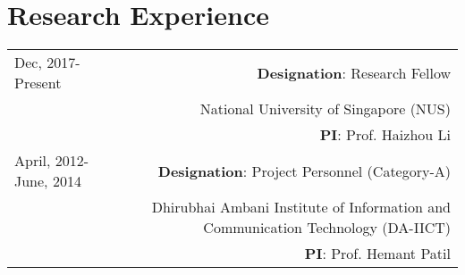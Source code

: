 \documentclass[10pt]{article}
\begin{document}
\section*{Research Experience}
\begin{tabular}{L!{\VRule}R}
Dec, 2017-Present&\textbf{Designation}: Research Fellow \\
& National University of Singapore (NUS)\\
		&\textbf{PI}: Prof. Haizhou Li
\vspace{0.4cm}\\
April, 2012-June, 2014&\textbf{Designation}: Project Personnel (Category-A) \\
& Dhirubhai Ambani Institute of Information and Communication Technology (DA-IICT)\\
		&\textbf{PI}: Prof. Hemant Patil\\

	
\end{tabular}

\end{document}
